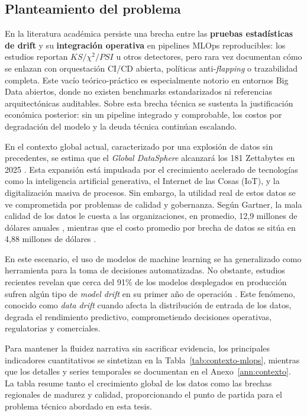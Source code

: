 \subsection{Planteamiento del problema}
En la literatura académica persiste una brecha entre las \textbf{pruebas estadísticas de drift} y su \textbf{integración operativa} en pipelines MLOps reproducibles: los estudios reportan $KS/\chi^2/PSI$ u otros detectores, pero rara vez documentan cómo se enlazan con orquestación CI/CD abierta, políticas anti-\emph{flapping} o trazabilidad completa. Este vacío teórico-práctico es especialmente notorio en entornos Big Data abiertos, donde no existen benchmarks estandarizados ni referencias arquitectónicas auditables. Sobre esta brecha técnica se sustenta la justificación económica posterior: sin un pipeline integrado y comprobable, los costos por degradación del modelo y la deuda técnica continúan escalando.

En el contexto global actual, caracterizado por una explosión de datos sin precedentes, se estima que el \emph{Global DataSphere} alcanzará los 181 Zettabytes en 2025 \citep{IDC2024}. Esta expansión está impulsada por el crecimiento acelerado de tecnologías como la inteligencia artificial generativa, el Internet de las Cosas (IoT), y la digitalización masiva de procesos. Sin embargo, la utilidad real de estos datos se ve comprometida por problemas de calidad y gobernanza. Según Gartner, la mala calidad de los datos le cuesta a las organizaciones, en promedio, 12,9 millones de dólares anuales \citep{Gartner2024}, mientras que el costo promedio por brecha de datos se sitúa en 4,88 millones de dólares \citep{IBM2024}.

En este escenario, el uso de modelos de machine learning se ha generalizado como herramienta para la toma de decisiones automatizadas. No obstante, estudios recientes revelan que cerca del 91\% de los modelos desplegados en producción sufren algún tipo de \emph{model drift} en su primer año de operación \citep{AIMultiple2025,Breck2019}. Este fenómeno, conocido como \emph{data drift} cuando afecta la distribución de entrada de los datos, degrada el rendimiento predictivo, comprometiendo decisiones operativas, regulatorias y comerciales.

Para mantener la fluidez narrativa sin sacrificar evidencia, los principales indicadores cuantitativos se sintetizan en la Tabla~\ref{tab:contexto-mlops}, mientras que los detalles y series temporales se documentan en el Anexo~\ref{ann:contexto}. La tabla resume tanto el crecimiento global de los datos como las brechas regionales de madurez y calidad, proporcionando el punto de partida para el problema técnico abordado en esta tesis.

